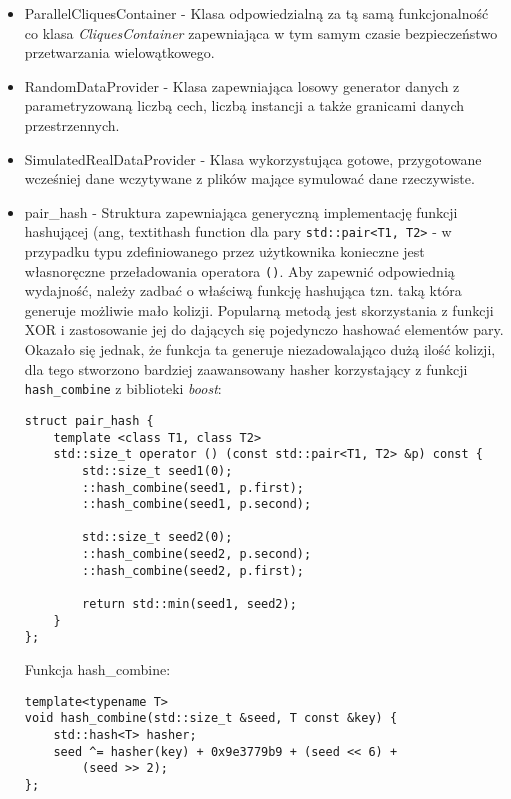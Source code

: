 \documentclass[12pt]{article}
\def\inline{\lstinline[basicstyle=\ttfamily,keywordstyle={}]}
\begin{document}
\begin{itemize}
\item ParallelCliquesContainer - Klasa odpowiedzialną za tą samą funkcjonalność co klasa \textit{CliquesContainer} zapewniająca w tym samym czasie bezpieczeństwo przetwarzania wielowątkowego.

\item RandomDataProvider - Klasa zapewniająca losowy generator danych z parametryzowaną liczbą cech, liczbą instancji a także granicami danych przestrzennych.

\item SimulatedRealDataProvider - Klasa wykorzystująca gotowe, przygotowane wcześniej dane wczytywane z plików mające symulować dane rzeczywiste.

\item pair\_hash - Struktura zapewniająca generyczną implementację funkcji hashującej (ang, 
textit{hash function} dla pary \inline{std::pair<T1, T2>} - w przypadku typu zdefiniowanego przez użytkownika konieczne jest własnoręczne przeładowania operatora \inline{()}. Aby zapewnić odpowiednią wydajność, należy zadbać o właściwą funkcję hashująca tzn. taką która generuje możliwie mało kolizji. Popularną metodą jest skorzystania z funkcji XOR i zastosowanie jej do dających się pojedynczo hashować elementów pary. Okazało się jednak, że funkcja ta generuje niezadowalająco dużą ilość kolizji, dla tego stworzono bardziej zaawansowany hasher korzystający z funkcji \inline{hash_combine} z biblioteki \textit{boost}:
\begin{minipage}{\linewidth}
\begin{lstlisting}[caption={Kod struktury pair\_hash}]
struct pair_hash {
	template <class T1, class T2>
	std::size_t operator () (const std::pair<T1, T2> &p) const {
		std::size_t seed1(0);
		::hash_combine(seed1, p.first);
		::hash_combine(seed1, p.second);

		std::size_t seed2(0);
		::hash_combine(seed2, p.second);
		::hash_combine(seed2, p.first);

		return std::min(seed1, seed2);
	}
};
\end{lstlisting}
\end{minipage}

Funkcja hash\_combine:
\begin{minipage}{\linewidth}
\begin{lstlisting}[caption={Kod funkcji hash\_combine}]
template<typename T>
void hash_combine(std::size_t &seed, T const &key) {
	std::hash<T> hasher;
	seed ^= hasher(key) + 0x9e3779b9 + (seed << 6) + 
    	(seed >> 2);
};
\end{lstlisting}
\end{minipage}


\end{itemize}
\end{document}
